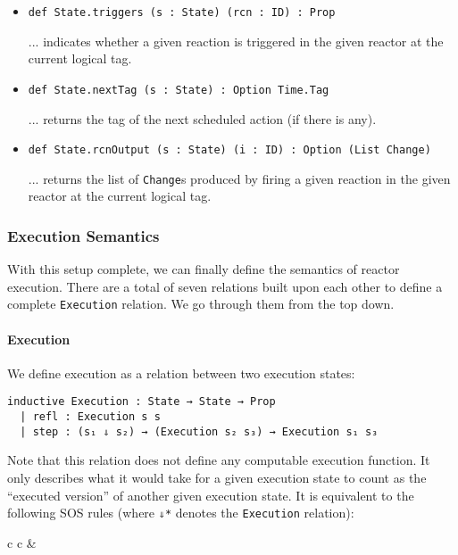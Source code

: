 \begin{itemize}
  \item \lstinline{def State.triggers (s : State) (rcn : ID) : Prop} 
  
  ... indicates whether a given reaction is triggered in the given reactor at the current logical tag. 
  
  \item \lstinline{def State.nextTag (s : State) : Option Time.Tag} 
  
  ... returns the tag of the next scheduled action (if there is any). 
  
  \item \lstinline{def State.rcnOutput (s : State) (i : ID) : Option (List Change)} 
  
  ... returns the list of \lstinline{Change}s produced by firing a given reaction in the given reactor at the current logical tag.
\end{itemize}

\subsubsection{Execution Semantics}

With this setup complete, we can finally define the semantics of reactor execution.
There are a total of seven relations built upon each other to define a complete \lstinline{Execution} relation.
We go through them from the top down.

\paragraph{Execution}

We define execution as a relation between two execution states:

\begin{lstlisting}
inductive Execution : State → State → Prop
  | refl : Execution s s
  | step : (s₁ ⇓ s₂) → (Execution s₂ s₃) → Execution s₁ s₃
\end{lstlisting}

Note that this relation does not define any computable execution function.
It only describes what it would take for a given execution state to count as the ``executed version'' of another given execution state.
It is equivalent to the following SOS rules (where \lstinline{⇓*} denotes the \lstinline{Execution} relation):

\vspace*{3mm}

\begin{tabular}{c c}
 & 
\end{tabular}

